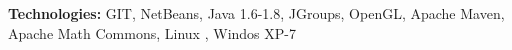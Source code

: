 \begin{cventries}
{\begin{cvitems}
        \item[] {\textbf{Technologies:} 
        \textcolor{rainbowcolor-olive}{GIT}, 
        \textcolor{rainbowcolor-olive}{NetBeans}, 
        \textcolor{rainbowcolor-indigo}{Java 1.6-1.8}, 
        \textcolor{rainbowcolor-indigo}{JGroups}, 
        \textcolor{rainbowcolor-indigo}{OpenGL}, 
        \textcolor{rainbowcolor-indigo}{Apache Maven}, 
        \textcolor{rainbowcolor-indigo}{Apache Math Commons}, 
        \textcolor{rainbowcolor-orange}{Linux %
        }, 
        \textcolor{rainbowcolor-orange}{Windos XP-7}}
      \end{cvitems}
    }

\hspace{-0.18cm}    
    

\end{cventries}
